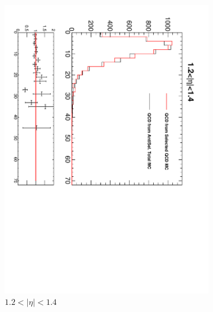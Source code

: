\begin{figure}[htbp]
\begin{subfigure}{0.45\textwidth}
    \includegraphics*[trim = 0mm 0mm 15mm 0mm, clip, width=\textwidth, angle=90]{MetCompare_anti_eta4.pdf}
    \caption{$1.2<| \eta |<1.4$}
    \label{fig:qcd_met_eta4}
  \end{subfigure}
  \begin{subfigure}{0.45\textwidth}
    \centering

\end{subfigure}
\end{figure}
